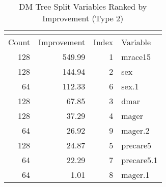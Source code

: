 \begingroup\small\setlength{\tabcolsep}{0.6em}\renewcommand{\arraystretch}{0.9}
\begin{longtable}{rrrp{3cm}}
\caption{DM Tree Split Variables Ranked by Improvement (Type 2)}\\
\label{tab:splits_type2_multipage}\\
\hline
Count & Improvement & Index & Variable \\ \hline
\endhead
128 & 549.99 & 1 & mrace15 \\
128 & 144.94 & 2 & sex \\
64 & 112.33 & 6 & sex.1 \\
128 & 67.85 & 3 & dmar \\
128 & 37.29 & 4 & mager \\
64 & 26.92 & 9 & mager.2 \\
128 & 24.87 & 5 & precare5 \\
64 & 22.29 & 7 & precare5.1 \\
64 & 1.01 & 8 & mager.1 \\
\hline
\end{longtable}
\endgroup
